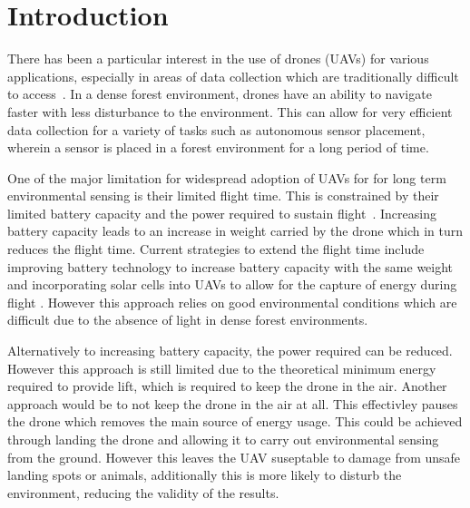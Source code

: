 \chapter{Introduction}
There has been a particular interest in the use of drones (UAVs) for various applications, especially in areas of data collection which are traditionally difficult to access~\cite{droneReview}.
In a dense forest environment, drones have an ability to navigate faster with less disturbance to the environment.
This can allow for very efficient data collection for a variety of tasks \cite{environmentalSensing} such as autonomous sensor placement, wherein a sensor is placed in a forest environment for a long period of time.

One of the major limitation for widespread adoption of UAVs for for long term environmental sensing is their limited flight time.
This is constrained by their limited battery capacity and the power required to sustain flight~\cite{droneBattery}.
Increasing battery capacity leads to an increase in weight carried by the drone which in turn reduces the flight time.
Current strategies to extend the flight time include improving battery technology to increase battery capacity with the same weight and incorporating solar cells into UAVs to allow for the capture of energy during flight \cite{droneSunlight}.
However this approach relies on good environmental conditions which are difficult due to the absence of light in dense forest environments.

Alternatively to increasing battery capacity, the power required can be reduced.
However this approach is still limited due to the theoretical minimum energy required to provide lift, which is required to keep the drone in the air.
Another approach would be to not keep the drone in the air at all.
This effectivley pauses the drone which removes the main source of energy usage.
This could be achieved through landing the drone and allowing it to carry out environmental sensing from the ground.
However this leaves the UAV suseptable to damage from unsafe landing spots or animals, additionally this is more likely to disturb the environment, reducing the validity of the results.

